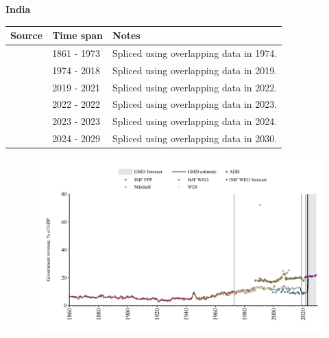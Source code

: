 \documentclass[12pt,a4paper,landscape]{article}
\begin{document}
\begin{adjustbox}{max totalsize={\paperwidth}{\paperheight},center}
\begin{minipage}[t][\textheight][t]{\textwidth}
\vspace*{0.5cm}
{}
\begin{center}
{\Large\bfseries India}
\end{center}
\vspace{0.5cm}
\begin{table}[H]
\centering
\small
\begin{tabular}{|l|l|l|}
\hline
\textbf{Source} & \textbf{Time span} & \textbf{Notes} \\
\hline
\rowcolor{white}\cite{IMF_FPP}& 1861 - 1973 &Spliced using overlapping data in 1974.\\
\rowcolor{lightgray}\cite{WDI}& 1974 - 2018 &Spliced using overlapping data in 2019.\\
\rowcolor{white}\cite{ADB}& 2019 - 2021 &Spliced using overlapping data in 2022.\\
\rowcolor{lightgray}\cite{WDI}& 2022 - 2022 &Spliced using overlapping data in 2023.\\
\rowcolor{white}\cite{ADB}& 2023 - 2023 &Spliced using overlapping data in 2024.\\
\rowcolor{lightgray}\cite{IMF_WEO_forecast}& 2024 - 2029 &Spliced using overlapping data in 2030.\\
\hline
\end{tabular}
\end{table}
\begin{figure}[H]
\centering
\includegraphics[width=\textwidth,height=0.6\textheight,keepaspectratio]{graphs/IND_govrev_GDP.pdf}
\end{figure}
\end{minipage}
\end{adjustbox}
\end{document}
